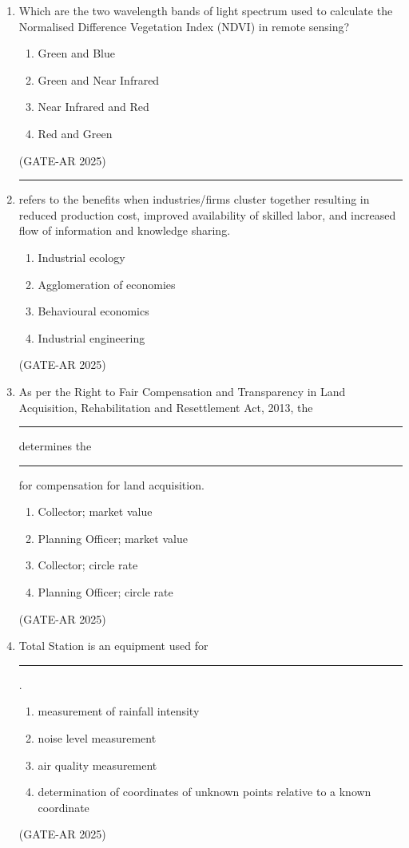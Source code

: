 \documentclass[a4paper,10pt]{article}
\begin{document}
\begin{enumerate}
    \item Which are the two wavelength bands of light spectrum used to calculate the Normalised Difference Vegetation Index (NDVI) in remote sensing?
    \begin{multicols}{2}
    \begin{enumerate}
        \item Green and Blue
        \item Green and Near Infrared
        \item Near Infrared and Red
        \item Red and Green
    \end{enumerate}
    \end{multicols}
    \hfill (GATE-AR 2025)

    \item \rule{2cm}{0.4pt} refers to the benefits when industries/firms cluster together resulting in reduced production cost, improved availability of skilled labor, and increased flow of information and knowledge sharing.
    \begin{multicols}{2}
    \begin{enumerate}
        \item Industrial ecology
        \item Agglomeration of economies
        \item Behavioural economics
        \item Industrial engineering
    \end{enumerate}
    \end{multicols}
    \hfill (GATE-AR 2025)
    
    \item As per the Right to Fair Compensation and Transparency in Land Acquisition, Rehabilitation and Resettlement Act, 2013, the \rule{2cm}{0.4pt} determines the \rule{2cm}{0.4pt} for compensation for land acquisition.
\begin{multicols}{2}
\begin{enumerate}
    \item Collector; market value
    \item Planning Officer; market value
    \item Collector; circle rate
    \item Planning Officer; circle rate
\end{enumerate}
\end{multicols}
\hfill (GATE-AR 2025)

\item Total Station is an equipment used for \rule{2cm}{0.4pt}.
\begin{enumerate}
    \item measurement of rainfall intensity
    \item noise level measurement
    \item air quality measurement
    \item determination of coordinates of unknown points relative to a known coordinate
\end{enumerate}
\hfill (GATE-AR 2025)


\end{enumerate}
\end{document}
